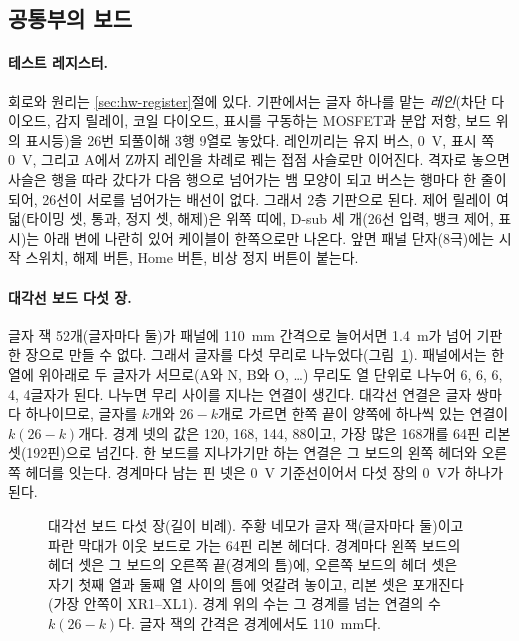 \subsection{공통부의 보드}\label{sec:hw-boards-common}

\paragraph{테스트 레지스터.} 회로와 원리는 \ref{sec:hw-register}절에 있다. 기판에서는 글자 하나를 맡는 \emph{레인}(차단
다이오드, 감지 릴레이, 코일 다이오드, 표시를 구동하는 MOSFET과 분압 저항, 보드 위의 표시등)을 26번 되풀이해 3행 9열로
놓았다. 레인끼리는 유지 버스, 0~V, 표시 쪽 0~V, 그리고 A에서 Z까지 레인을 차례로 꿰는 접점 사슬로만 이어진다. 격자로
놓으면 사슬은 행을 따라 갔다가 다음 행으로 넘어가는 뱀 모양이 되고 버스는 행마다 한 줄이 되어, 26선이 서로를 넘어가는
배선이 없다. 그래서 2층 기판으로 된다. 제어 릴레이 여덟(타이밍 셋, 통과, 정지 셋, 해제)은 위쪽 띠에, D-sub 세 개(26선
입력, 뱅크 제어, 표시)는 아래 변에 나란히 있어 케이블이 한쪽으로만 나온다. 앞면 패널 단자(8극)에는 시작 스위치, 해제
버튼, Home 버튼, 비상 정지 버튼이 붙는다.

\paragraph{대각선 보드 다섯 장.} 글자 잭 52개(글자마다 둘)가 패널에 110~mm 간격으로 늘어서면 1.4~m가 넘어 기판 한 장으로
만들 수 없다. 그래서 글자를 다섯 무리로 나누었다(그림~\ref{fig:hw-diag-split}). 패널에서는 한 열에 위아래로 두 글자가
서므로(A와 N, B와 O, \ldots) 무리도 열 단위로 나누어 6, 6, 6, 4, 4글자가 된다. 나누면 무리 사이를 지나는 연결이 생긴다.
대각선 연결은 글자 쌍마다 하나이므로, 글자를 $k$개와 $26-k$개로 가르면 한쪽 끝이 양쪽에 하나씩 있는 연결이 $k(26-k)$개다.
경계 넷의 값은 120, 168, 144, 88이고, 가장 많은 168개를 64핀 리본 셋(192핀)으로 넘긴다. 한 보드를 지나가기만 하는
연결은 그 보드의 왼쪽 헤더와 오른쪽 헤더를 잇는다. 경계마다 남는 핀 넷은 0~V 기준선이어서 다섯 장의 0~V가 하나가 된다.

\begin{figure}[ht]
\centering

\caption{대각선 보드 다섯 장(길이 비례). 주황 네모가 글자 잭(글자마다 둘)이고 파란 막대가 이웃 보드로 가는 64핀 리본
헤더다. 경계마다 왼쪽 보드의 헤더 셋은 그 보드의 오른쪽 끝(경계의 틈)에, 오른쪽 보드의 헤더 셋은 자기 첫째 열과 둘째 열
사이의 틈에 엇갈려 놓이고, 리본 셋은 포개진다(가장 안쪽이 XR1--XL1). 경계 위의 수는 그 경계를 넘는 연결의 수 $k(26-k)$다.
글자 잭의 간격은 경계에서도 110~mm다.}
\label{fig:hw-diag-split}
\end{figure}

